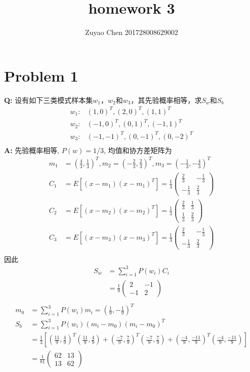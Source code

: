 \documentclass[12pt,a4paper]{article}
\title{homework 3}
\author{Zuyao Chen 201728008629002}
\date{}
\begin{document}
\maketitle
\section{Problem 1}
\textbf{Q: } 
设有如下三类模式样本集$w_1$，$w_2$和$w_3$，其先验概率相等，求$S_w$和$S_b$
\[
	\begin{split}
		w_1:& (1,0)^T, (2,0)^T, (1,1)^T  \\
		w_2:& (-1,0)^T, (0,1)^T, (-1,1)^T   \\
		w_3:& (-1,-1)^T, (0,-1)^T, (0,-2)^T \\
	\end{split}
\]
\textbf{A: }
先验概率相等, $P(w) = 1/3$,  均值和协方差矩阵为
\[
	\begin{split}
	 m_1 &= (\frac{4}{3}, \frac{1}{3})^T, m_2 = (-\frac{2}{3},   	\frac{2}{3})^T, m_3 = (-\frac{1}{3}, -\frac{4}{3})^T \\
	 C_1 &= E[(x-m_1)(x-m_1)^T] = \frac{1}{3} \left(\begin{array}{cc} 
		 \frac{2}{3} & -\frac{1}{3} \\
		 -\frac{1}{3} & \frac{2}{3}
	 \end{array} \right)  \\
	 C_2 &= E[(x-m_2)(x-m_2)^T] = \frac{1}{3} \left(\begin{array}{cc} 
	 \frac{2}{3} & \frac{1}{3} \\
	 \frac{1}{3} & \frac{2}{3}
	 \end{array} \right)  \\
	 C_3 &= E[(x-m_3)(x-m_3)^T] = \frac{1}{3} \left(\begin{array}{cc} 
	 \frac{2}{3} & -\frac{1}{3} \\
	 -\frac{1}{3} & \frac{2}{3}
	 \end{array} \right)  \\	 
	\end{split}
\]
因此
\[
	\begin{split} 
	S_w &= \sum_{i=1}^{3}P(w_i)C_i  \\
		&= \frac{1}{9} \left(\begin{array}{cc}
			2 & -1 \\
			-1 & 2
		\end{array} \right) \\
	\end{split} 	
\]
 \[ \begin{split} 
	 m_0 &= \sum_{i=1}^{3} P(w_i)m_i =  (\frac{1}{9}, -\frac{1}{9})^T \\
	 S_b &= \sum_{i=1}^{3} P(w_i)(m_i - m_0)(m_i - m_0)^T \\
		 &= \frac{1}{3} [	
			 (\frac{11}{9},\frac{4}{9})^T(\frac{11}{9},\frac{4}{9}) 
			+ (\frac{-7}{9},\frac{7}{9})^T (\frac{-7}{9},\frac{7}{9}) 
			+(\frac{-4}{9},\frac{-11}{9})^T(\frac{-4}{9},\frac{-11}{9}) 
		 ] \\
		 &= \frac{1}{81} \left(\begin{array}{cc}
			62 & 13 \\
			13 & 62
		 \end{array} \right) 
	\end{split}  
 \]
\end{document}
